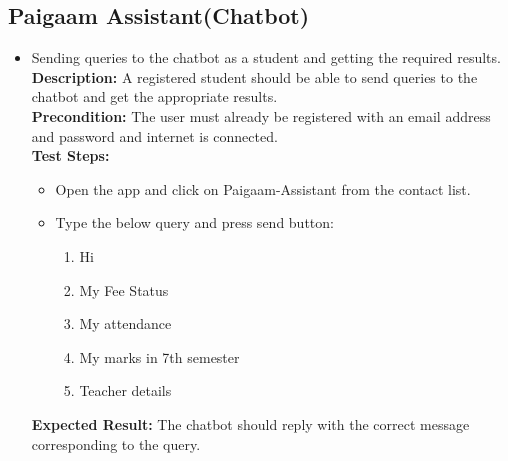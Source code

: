 \subsection{Paigaam Assistant(Chatbot)}
\begin{itemize}
\item
 Sending queries to the chatbot as a student and getting the required results.
\noindent \textbf{Description:}
A registered student should be able to send queries to the chatbot and get the appropriate
results.\\
\noindent \textbf{Precondition:}
The user must already be registered with an email address and password and internet is
connected.\\
\noindent \textbf{Test Steps:}
\begin{itemize}
\item Open the app and click on Paigaam-Assistant from the contact list.
\item Type the below query and press send button:
\begin{enumerate}
\item Hi
\item My Fee Status
\item My attendance
\item My marks in 7th semester
\item Teacher details
\end{enumerate}
\end{itemize}
\noindent \textbf{Expected Result:}
The chatbot should reply with the correct message corresponding to the query.\\


\end{itemize}
